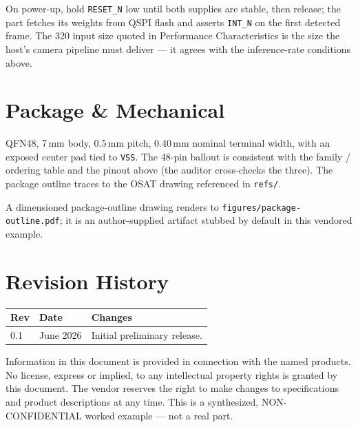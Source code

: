 \documentclass{anvil-datasheet}
\begin{document}
\begin{callout}[title=Reset and boot]
On power-up, hold \texttt{RESET\_N} low until both supplies are stable, then
release; the part fetches its weights from QSPI flash and asserts
\texttt{INT\_N} on the first detected frame. The 320 input size
quoted in Performance Characteristics is the size the host's camera pipeline
must deliver --- it agrees with the inference-rate conditions above.
\end{callout}

\section{Package \& Mechanical}

QFN48, 7\,mm body, 0.5\,mm pitch, 0.40\,mm nominal terminal width,
with an exposed center pad tied to \texttt{VSS}. The 48-pin ballout is consistent
with the family / ordering table and the pinout above (the auditor cross-checks
the three). The package outline traces to the OSAT drawing referenced in
\texttt{refs/}.

\begin{callout}[title=Package outline]
A dimensioned package-outline drawing renders to
\texttt{figures/package-outline.pdf}; it is an author-supplied artifact stubbed
by default in this vendored example.
\end{callout}

\section{Revision History}

\begin{specbox}
\begin{tabularx}{\textwidth}{@{} l l X @{}}
\toprule
\textbf{Rev} & \textbf{Date} & \textbf{Changes} \\
\midrule
0.1 & June 2026 & Initial preliminary release. \\
\bottomrule
\end{tabularx}
\end{specbox}

\preliminarynotice

{\footnotesize\color{muted} Information in this document is provided in
connection with the named products. No license, express or implied, to any
intellectual property rights is granted by this document. The vendor reserves
the right to make changes to specifications and product descriptions at any
time. This is a synthesized, NON-CONFIDENTIAL worked example --- not a real
part.}
\end{document}
